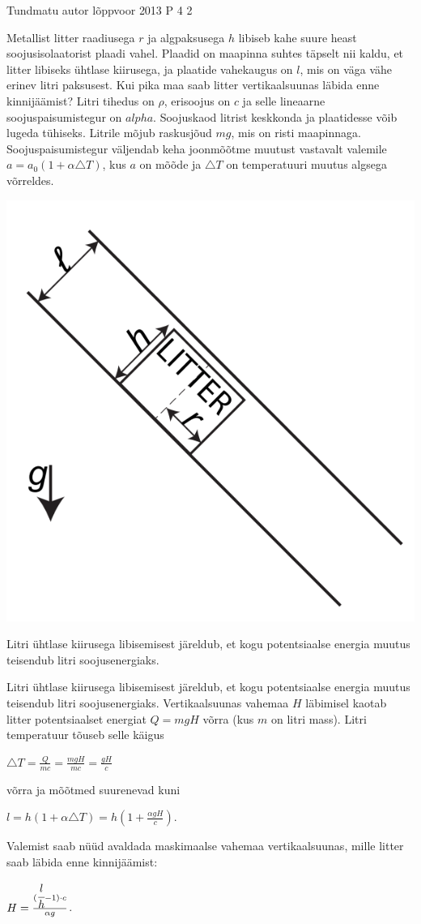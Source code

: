 {Tundmatu autor} %
{lõppvoor} %
{2013} %
{P 4} %
{2} %
{

\ifStatement
Metallist litter raadiusega $r$ ja algpaksusega $h$ libiseb kahe suure heast soojusisolaatorist plaadi vahel. Plaadid on maapinna suhtes täpselt nii kaldu, et litter libiseks ühtlase kiirusega, ja plaatide vahekaugus on $l$, mis on väga vähe erinev litri paksusest. Kui pika maa saab litter vertikaalsuunas läbida enne kinnijäämist? Litri tihedus on $\rho$, erisoojus on $c$ ja selle lineaarne soojuspaisumistegur on $alpha$. Soojuskaod litrist keskkonda ja plaatidesse võib lugeda tühiseks. Litrile mõjub raskusjõud $mg$, mis on risti maapinnaga. Soojuspaisumistegur väljendab keha joonmõõtme muutust vastavalt valemile $a = a_0(1 + \alpha \triangle T)$, kus $a$ on mõõde ja $\triangle T$ on temperatuuri muutus algsega võrreldes. 
\begin{center}
	\includegraphics[width=0.5\linewidth]{2013-v3p-04-yl.PNG}
\end{center}
\fi

\ifHint
Litri ühtlase kiirusega libisemisest järeldub, et kogu potentsiaalse energia muutus teisendub litri soojusenergiaks. 
\fi

\ifSolution
Litri ühtlase kiirusega libisemisest järeldub, et kogu potentsiaalse energia muutus teisendub litri soojusenergiaks. Vertikaalsuunas vahemaa $H$ läbimisel kaotab litter potentsiaalset energiat $Q = mgH$ võrra (kus $m$ on litri mass). Litri temperatuur tõuseb selle käigus
\begin{center}
$\triangle T = \frac{Q}{mc} = \frac{mgH}{mc} = \frac{gH}{c}$
\end{center}
võrra ja mõõtmed suurenevad kuni 
\begin{center}
$l = h(1 + \alpha \triangle T) = h(1 + \frac{\alpha g H}{c})$. 
\end{center}
Valemist saab nüüd avaldada maskimaalse vahemaa vertikaalsuunas, mille litter saab läbida enne kinnijäämist:
\begin{center}
$H = \frac{(\cfrac{l}{h} - 1) \cdot c}{\alpha g}$.
\end{center}
\fi
}